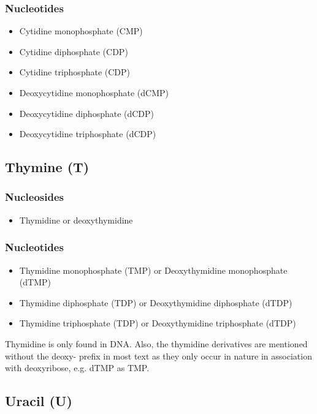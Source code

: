 \documentclass[11pt]{article}
\begin{document}
\subsubsection{Nucleotides}
\label{sec:org1f4eb0f}
\begin{itemize}
\item Cytidine monophosphate (CMP)
\item Cytidine diphosphate (CDP)
\item Cytidine triphosphate (CDP)
\item Deoxycytidine monophosphate (dCMP)
\item Deoxycytidine diphosphate (dCDP)
\item Deoxycytidine triphosphate (dCDP)

\newpage
\end{itemize}

\subsection{Thymine (T)}
\label{sec:orgc2e1352}

\subsubsection{Nucleosides}
\label{sec:org96e8abf}
\begin{itemize}
\item Thymidine or deoxythymidine
\end{itemize}

\subsubsection{Nucleotides}
\label{sec:orgc29a75c}
\begin{itemize}
\item Thymidine monophosphate (TMP) or Deoxythymidine monophosphate (dTMP)
\item Thymidine diphosphate (TDP) or Deoxythymidine diphosphate (dTDP)
\item Thymidine triphosphate (TDP) or Deoxythymidine triphosphate (dTDP)
\end{itemize}

Thymidine is only found in DNA. Also, the thymidine derivatives are mentioned without the deoxy- prefix in most text as they only occur in nature in association with deoxyribose, e.g. dTMP as TMP.

\subsection{Uracil (U)}
\label{sec:org38b78a0}
\end{document}
